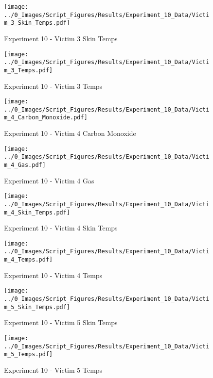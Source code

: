 	\begin{figure}[H]
		\centering
		\texttt{[image: ../0\_Images/Script\_Figures/Results/Experiment\_10\_Data/Victim\_3\_Skin\_Temps.pdf]}
		\caption[]{Experiment 10 - Victim 3 Skin Temps}
	\end{figure}
 
	\clearpage

	\begin{figure}[H]
		\centering
		\texttt{[image: ../0\_Images/Script\_Figures/Results/Experiment\_10\_Data/Victim\_3\_Temps.pdf]}
		\caption[]{Experiment 10 - Victim 3 Temps}
	\end{figure}
 

	\begin{figure}[H]
		\centering
		\texttt{[image: ../0\_Images/Script\_Figures/Results/Experiment\_10\_Data/Victim\_4\_Carbon\_Monoxide.pdf]}
		\caption[]{Experiment 10 - Victim 4 Carbon Monoxide}
	\end{figure}
 
	\clearpage

	\begin{figure}[H]
		\centering
		\texttt{[image: ../0\_Images/Script\_Figures/Results/Experiment\_10\_Data/Victim\_4\_Gas.pdf]}
		\caption[]{Experiment 10 - Victim 4 Gas}
	\end{figure}
 

	\begin{figure}[H]
		\centering
		\texttt{[image: ../0\_Images/Script\_Figures/Results/Experiment\_10\_Data/Victim\_4\_Skin\_Temps.pdf]}
		\caption[]{Experiment 10 - Victim 4 Skin Temps}
	\end{figure}
 
	\clearpage

	\begin{figure}[H]
		\centering
		\texttt{[image: ../0\_Images/Script\_Figures/Results/Experiment\_10\_Data/Victim\_4\_Temps.pdf]}
		\caption[]{Experiment 10 - Victim 4 Temps}
	\end{figure}
 

	\begin{figure}[H]
		\centering
		\texttt{[image: ../0\_Images/Script\_Figures/Results/Experiment\_10\_Data/Victim\_5\_Skin\_Temps.pdf]}
		\caption[]{Experiment 10 - Victim 5 Skin Temps}
	\end{figure}
 
	\clearpage

	\begin{figure}[H]
		\centering
		\texttt{[image: ../0\_Images/Script\_Figures/Results/Experiment\_10\_Data/Victim\_5\_Temps.pdf]}
		\caption[]{Experiment 10 - Victim 5 Temps}
	\end{figure}
 

